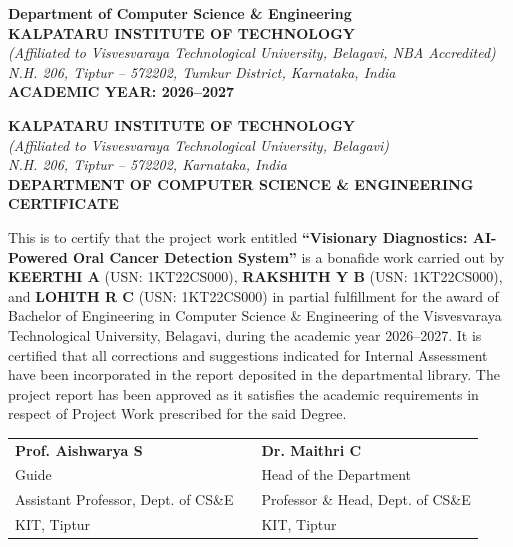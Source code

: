 \documentclass[12pt,a4paper,oneside]{report}
\newcommand{\projecttitle}{Visionary Diagnostics: AI-Powered Oral Cancer Detection System}
\newcommand{\deptname}{Department of Computer Science \& Engineering}
\newcommand{\academicyear}{2026--2027}
\newcommand{\guidename}{Prof. Aishwarya S}
\newcommand{\hodname}{Dr. Maithri C}
\begin{document}
\begin{titlepage}
\begin{center}
\textbf{\fontsize{13}{16}\selectfont \deptname}\\[0.15cm]
\textbf{\fontsize{14}{17}\selectfont KALPATARU INSTITUTE OF TECHNOLOGY}\\[0.1cm]
\textit{\fontsize{10}{13}\selectfont (Affiliated to Visvesvaraya Technological University, Belagavi, NBA Accredited)}\\[0.1cm]
\textit{\fontsize{10}{13}\selectfont N.H. 206, Tiptur -- 572202, Tumkur District, Karnataka, India}\\[0.4cm]

\textbf{\fontsize{12}{15}\selectfont ACADEMIC YEAR: \academicyear}

\end{center}
\end{titlepage}

\newpage
\thispagestyle{plain}
\begin{center}
\textbf{\fontsize{14}{17}\selectfont KALPATARU INSTITUTE OF TECHNOLOGY}\\
\textit{\fontsize{10.5}{13}\selectfont (Affiliated to Visvesvaraya Technological University, Belagavi)}\\
\textit{\fontsize{10.5}{13}\selectfont N.H. 206, Tiptur -- 572202, Karnataka, India}\\[0.3cm]
\textbf{\fontsize{13}{16}\selectfont \MakeUppercase{\deptname}}\\[0.5cm]
\textbf{\fontsize{16}{19}\selectfont CERTIFICATE}\\[0.5cm]
\end{center}

This is to certify that the project work entitled \textbf{``\projecttitle''} is a bonafide work carried out by \textbf{KEERTHI A} (USN: 1KT22CS000), \textbf{RAKSHITH Y B} (USN: 1KT22CS000), and \textbf{LOHITH R C} (USN: 1KT22CS000) in partial fulfillment for the award of Bachelor of Engineering in Computer Science \& Engineering of the Visvesvaraya Technological University, Belagavi, during the academic year 2026--2027. It is certified that all corrections and suggestions indicated for Internal Assessment have been incorporated in the report deposited in the departmental library. The project report has been approved as it satisfies the academic requirements in respect of Project Work prescribed for the said Degree.

\vspace{1.8cm}

\noindent
\begin{tabular}{p{5cm}p{3cm}p{5cm}}
\textbf{\guidename} & & \textbf{\hodname} \\
Guide & & Head of the Department \\
Assistant Professor, Dept. of CS\&E & & Professor \& Head, Dept. of CS\&E \\
KIT, Tiptur & & KIT, Tiptur \\
\end{tabular}
\end{document}
